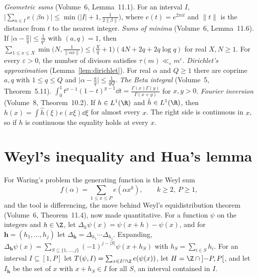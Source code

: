 \begin{reminder}
\emph{Geometric sums} (Volume~6, Lemma~11.1). For an interval $I$, $\bigl|\sum_{n\in I}e(\beta n)\bigr|\le\min\bigl(|I|+1,\frac1{2\|\beta\|}\bigr)$, where $e(t)=e^{2\pi it}$ and $\|t\|$ is the distance from $t$ to the nearest integer.
\emph{Sums of minima} (Volume~6, Lemma~11.6). If $\bigl|\alpha-\frac aq\bigr|\le\frac1{q^2}$ with $(a,q)=1$, then $\sum_{1\le x\le X}\min\bigl(N,\frac1{\|\alpha x\|}\bigr)\le\bigl(\frac Xq+1\bigr)(4N+2q+2q\log q)$ for real $X,N\ge1$. For every $\varepsilon>0$, the number of divisors satisfies $\tau(m)\ll_\varepsilon m^\varepsilon$.
\emph{Dirichlet's approximation} (Lemma~\ref{lem:dirichlet}). For real $\alpha$ and $Q\ge1$ there are coprime $a,q$ with $1\le q\le Q$ and $\bigl|\alpha-\frac aq\bigr|\le\frac1{qQ}$.
\emph{The Beta integral} (Volume~5, Theorem~5.11). $\int_0^1 t^{x-1}(1-t)^{y-1}\dd t=\frac{\Gamma(x)\Gamma(y)}{\Gamma(x+y)}$ for $x,y>0$.
\emph{Fourier inversion} (Volume~8, Theorem~10.2). If $h\in L^1(\R)$ and $\hat h\in L^1(\R)$, then $h(x)=\int\hat h(\xi)e(x\xi)\dd\xi$ for almost every $x$. The right side is continuous in $x$, so if $h$ is continuous the equality holds at every $x$.
\end{reminder}

\section{Weyl's inequality and Hua's lemma}

For Waring's problem the generating function is the Weyl sum
\[
f(\alpha)=\sum_{1\le x\le P}e(\alpha x^k),\qquad k\ge2,\ P\ge1,
\]
and the tool is differencing, the move behind Weyl's equidistribution theorem (Volume~6, Theorem~11.4), now made quantitative. For a function $\psi$ on the integers and $h\in\Z$, let $\Delta_h\psi(x)=\psi(x+h)-\psi(x)$, and for $\mathbf h=(h_1,\dots,h_j)$ let $\Delta_{\mathbf h}=\Delta_{h_1}\cdots\Delta_{h_j}$. Expanding, $\Delta_{\mathbf h}\psi(x)=\sum_{S\subseteq\{1,\dots,j\}}(-1)^{j-|S|}\psi(x+h_S)$ with $h_S=\sum_{i\in S}h_i$. For an interval $I\subseteq[1,P]$ let $T(\psi,I)=\sum_{x\in I\cap\Z}e(\psi(x))$, let $H=\Z\cap\left]-P,P\right[$, and let $I_{\mathbf h}$ be the set of $x$ with $x+h_S\in I$ for all $S$, an interval contained in $I$.


